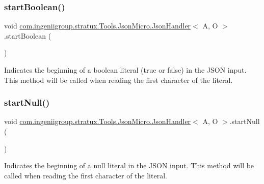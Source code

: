 \subsubsection{\texorpdfstring{start\+Boolean()}{startBoolean()}}
{\footnotesize\ttfamily void \hyperlink{classcom_1_1ingeniigroup_1_1stratux_1_1_tools_1_1_json_micro_1_1_json_handler}{com.\+ingeniigroup.\+stratux.\+Tools.\+Json\+Micro.\+Json\+Handler}$<$ A, O $>$.start\+Boolean (\begin{DoxyParamCaption}{ }\end{DoxyParamCaption})}

Indicates the beginning of a boolean literal ({\ttfamily true} or {\ttfamily false}) in the J\+S\+ON input. This method will be called when reading the first character of the literal. \mbox{\label{classcom_1_1ingeniigroup_1_1stratux_1_1_tools_1_1_json_micro_1_1_json_handler_aed388437756c3880e84bffd35da6cc6d}} 
\subsubsection{\texorpdfstring{start\+Null()}{startNull()}}
{\footnotesize\ttfamily void \hyperlink{classcom_1_1ingeniigroup_1_1stratux_1_1_tools_1_1_json_micro_1_1_json_handler}{com.\+ingeniigroup.\+stratux.\+Tools.\+Json\+Micro.\+Json\+Handler}$<$ A, O $>$.start\+Null (\begin{DoxyParamCaption}{ }\end{DoxyParamCaption})}

Indicates the beginning of a {\ttfamily null} literal in the J\+S\+ON input. This method will be called when reading the first character of the literal. \mbox{\label{classcom_1_1ingeniigroup_1_1stratux_1_1_tools_1_1_json_micro_1_1_json_handler_aa092122e9575ce99623937237357ec14}} 
